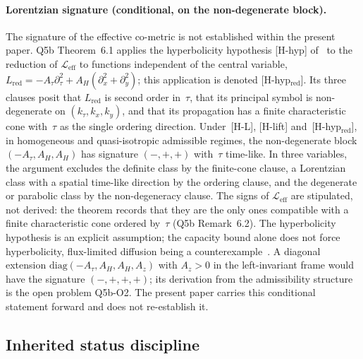 \documentclass[11pt,a4paper]{article}
\begin{document}
    \paragraph{Lorentzian signature (conditional, on the non-degenerate block).}
      \label{par:signature-origin}
      The signature of the effective co-metric is not established within the present paper.
      Q5b Theorem~6.1 applies the hyperbolicity hypothesis [H-hyp] of~\cite{Beau2026c} to the reduction of
      $\mathcal{L}_{\mathrm{eff}}$ to functions independent of the central variable,
      $L_{\mathrm{red}} = -A_\tau\partial_\tau^2 + A_H(\partial_x^2 + \partial_y^2)$; this application is denoted
      [H-hyp$_{\mathrm{red}}$].
      Its three clauses posit that $L_{\mathrm{red}}$ is second order in~$\tau$, that its principal symbol is
      non-degenerate on $(k_\tau, k_x, k_y)$, and that its propagation has a finite characteristic cone with~$\tau$ as
      the single ordering direction.
      Under~[H-L], [H-lift] and~[H-hyp$_{\mathrm{red}}$], in homogeneous and quasi-isotropic admissible regimes, the
      non-degenerate block $(-A_\tau, A_H, A_H)$ has signature $(-,+,+)$ with~$\tau$ time-like.
      In three variables, the argument excludes the definite class by the finite-cone clause, a Lorentzian class with
      a spatial time-like direction by the ordering clause, and the degenerate or parabolic class by the
      non-degeneracy clause.
      The signs of $\mathcal{L}_{\mathrm{eff}}$ are stipulated, not derived: the theorem records that they are the only
      ones compatible with a finite characteristic cone ordered by~$\tau$ (Q5b Remark~6.2).
      The hyperbolicity hypothesis is an explicit assumption; the capacity bound alone does not force hyperbolicity,
      flux-limited diffusion being a counterexample~\cite{Beau2026c,Rosenau1992}.
      A diagonal extension $\mathrm{diag}(-A_\tau, A_H, A_H, A_z)$ with $A_z > 0$ in the left-invariant frame would have
      the signature $(-,+,+,+)$; its derivation from the admissibility structure is the open problem Q5b-O2.
      The present paper carries this conditional statement forward and does not re-establish it.

  \subsection{Inherited status discipline}
  \label{sec:status}
\end{document}
